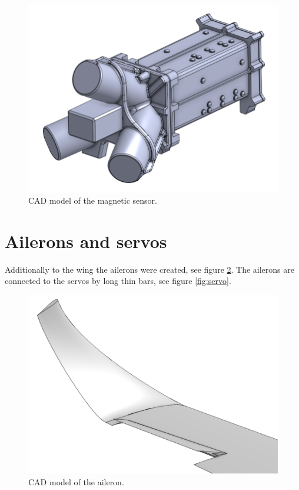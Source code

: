 \documentclass[english,fira]{ist-report}
\begin{document}
\begin{figure}[ht]
	\centering
	\includegraphics[width = 1\linewidth]{graphics/cad/sensorSide.png}
	\caption{CAD model of the magnetic sensor.}
	\label{fig:sensor}
\end{figure}

\section{Ailerons and servos}

Additionally to the wing the ailerons were created, see figure \ref{fig:aileron}. The ailerons are connected to the servos by long thin bars, see figure \ref{fig:servo}.

\begin{figure}[!ht]
	\centering
	\includegraphics[width = 1\linewidth]{graphics/cad/aileron1.png}
	\caption{CAD model of the aileron.}
	\label{fig:aileron}
\end{figure}
\end{document}
